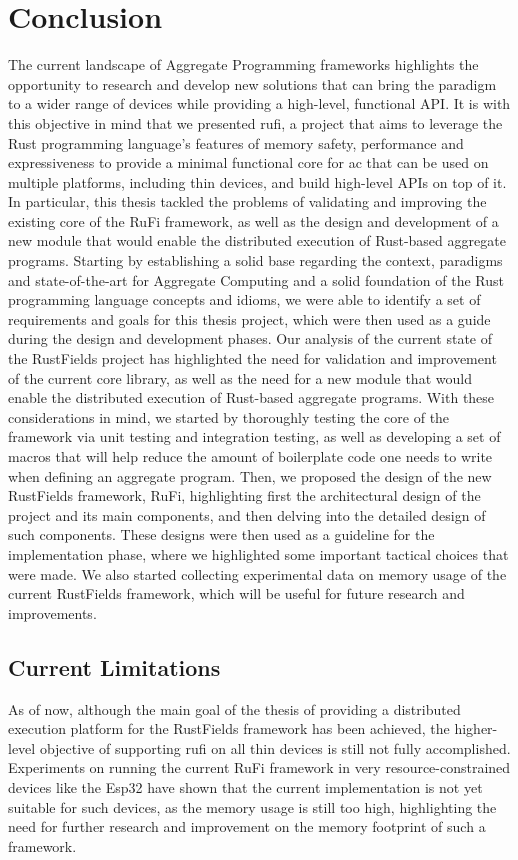 
\chapter{Conclusion}
\label{chap:conclusions}
The current landscape of Aggregate Programming frameworks highlights the opportunity to research and develop new solutions that can bring the paradigm to a wider range of devices
while providing a high-level, functional API. It is with this objective in mind that we presented \ac{rufi}, a project that aims to leverage the Rust programming language's features of memory safety,
performance and expressiveness to provide a minimal functional core for \ac{ac} that can be used on multiple platforms, including thin devices, and build high-level APIs on top of it.
In particular, this thesis tackled the problems of validating and improving the existing core of the RuFi framework, as well as the design and development of a new module that would enable the distributed execution of Rust-based aggregate programs.
Starting by establishing a solid base regarding the context, paradigms and state-of-the-art for Aggregate Computing and a solid foundation of the Rust programming language concepts and idioms,
we were able to identify a set of requirements and goals for this thesis project, which were then used as a guide during the design and development phases.
Our analysis of the current state of the RustFields project has highlighted the need for validation and improvement of the current core library, as well as the need for a new module that would enable
the distributed execution of Rust-based aggregate programs. With these considerations in mind, we started by thoroughly testing the core of the framework via unit testing and integration testing, as well as developing
a set of macros that will help reduce the amount of boilerplate code one needs to write when defining an aggregate program. Then, we proposed the design of the new RustFields framework, RuFi, highlighting first the architectural design of the project and its main
components, and then delving into the detailed design of such components. These designs were then used as a guideline for the implementation phase, where we highlighted some important tactical choices that were made.
We also started collecting experimental data on memory usage of the current RustFields framework, which will be useful for future research and improvements.

\section{Current Limitations}
As of now, although the main goal of the thesis of providing a distributed execution platform for the RustFields framework has been achieved, the higher-level objective of supporting \ac{rufi} on all thin devices is still not fully accomplished.
Experiments on running the current RuFi framework in very resource-constrained devices like the Esp32 have shown that the current implementation is not yet suitable for such devices, as the memory usage is still too high, highlighting the need
for further research and improvement on the memory footprint of such a framework.

